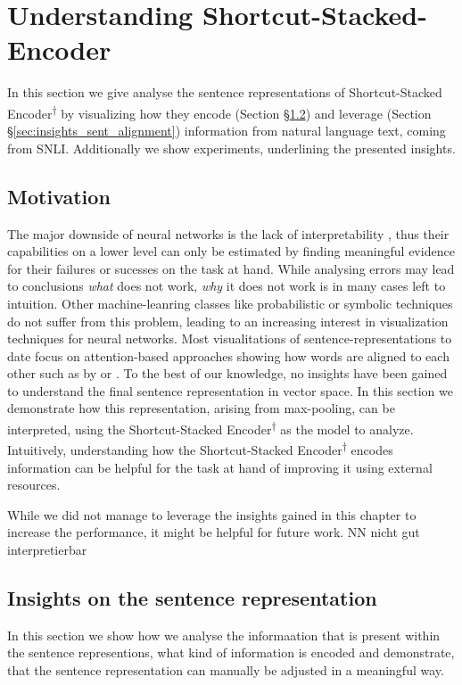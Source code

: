 \section{Understanding Shortcut-Stacked-Encoder}\label{sec:understanding}
In this section we give analyse the sentence representations of Shortcut-Stacked Encoder\textsuperscript{$\dagger$} by visualizing how they encode (Section §\ref{sec:insights_sent_repr}) and leverage (Section §\ref{sec:insights_sent_alignment}) information from natural language text, coming from \ac{SNLI}. Additionally we show experiments, underlining the presented insights.
\subsection{Motivation}
The major downside of neural networks is the lack of interpretability \citep{goldberg2017Apr}, thus their capabilities on a lower level can only be estimated by finding meaningful evidence for their failures or sucesses on the task at hand. While analysing errors may lead to conclusions \textit{what} does not work, \textit{why} it does not work is in many cases left to intuition. Other machine-leanring classes like probabilistic or symbolic techniques do not suffer from this problem, leading to an increasing interest in visualization techniques for neural networks. Most visualitations of sentence-representations to date focus on attention-based approaches showing how words are aligned to each other such as by \cite{shen2018reinforced} or \cite{im2017distance}. To the best of our knowledge, no insights have been gained to understand the final sentence representation in vector space. In this section we demonstrate how this representation, arising from max-pooling, can be interpreted, using the Shortcut-Stacked Encoder\textsuperscript{$\dagger$} as the model to analyze. Intuitively, understanding how the Shortcut-Stacked Encoder\textsuperscript{$\dagger$} encodes information can be helpful for the task at hand of improving it using external resources. 
\newline

\noindent
While we did not manage to leverage the insights gained in this chapter to increase the performance, it might be helpful for future work.
NN nicht gut interpretierbar

\subsection{Insights on the sentence representation}\label{sec:insights_sent_repr}
In this section we show how we analyse the informaation that is present within the sentence representions, what kind of information is encoded and demonstrate, that the sentence representation can manually be adjusted in a meaningful way.
